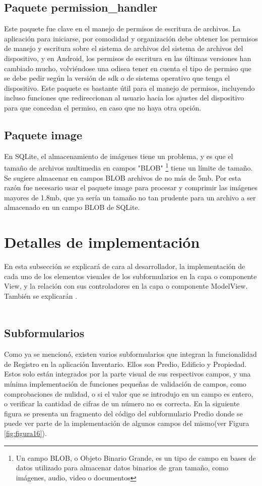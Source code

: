 \subsection{Paquete permission\_handler}
Este paquete fue clave en el manejo de permisos de escritura de archivos. La aplicación para iniciarse, por comodidad y organización debe obtener los permisos de manejo y escritura sobre el sistema de archivos
del sistema de archivos del dispositivo, y en Android, los permisos de escritura en las últimas versiones han cambiado mucho, volviéndose una odisea tener en cuenta el tipo de permiso que se debe pedir
según la versión de sdk o de sistema operativo que tenga el dispositivo. Este paquete es bastante útil para el manejo de permisos, incluyendo incluso funciones que redireccionan al usuario hacia los ajustes del
dispositivo para que concedan el permiso, en caso que no haya otra opción.
\subsection{Paquete image}
En SQLite, el almacenamiento de imágenes tiene un problema, y es que el tamaño de archivos multimedia en campos "BLOB"
\footnote{Un campo BLOB, o Objeto Binario Grande, es un tipo de campo en bases de datos utilizado para almacenar datos binarios de gran tamaño, como imágenes, audio, video o documentos}
tiene un límite de tamaño. Se sugiere almacenar en campos BLOB archivos de no más de 5mb. Por esta razón fue necesario usar el paquete image\cite{image} para procesar y comprimir las imágenes mayores de 1.8mb, que ya sería un tamaño no tan prudente
para un archivo a ser almacenado en un campo BLOB de SQLite.
\section{Detalles de implementación}
En esta subsección se explicará de cara al desarrollador, la implementación de cada uno de los elementos visuales de los subformularios en la capa o componente View, y la relación con sus controladores en la capa o componente ModelView. También se explicarán .\\\\
\subsection{Subformularios}
Como ya se mencionó, existen varios subformularios que integran la funcionalidad de Registro en la aplicación Inventario. Ellos son Predio, Edificio y Propiedad. Estos solo están integrados por la parte visual de sus respectivos campos, y una mínima implementación
de funciones pequeñas de validación de campos, como comprobaciones de nulidad, o si el valor que se introdujo en un campo es entero, o verificar la cantidad de cifras de un número no es correcta. En la siguiente figura se presenta un fragmento del código del subformulario
Predio donde se puede ver parte de la implementación de algunos campos del mismo(ver Figura \ref{fig:figura16}).

